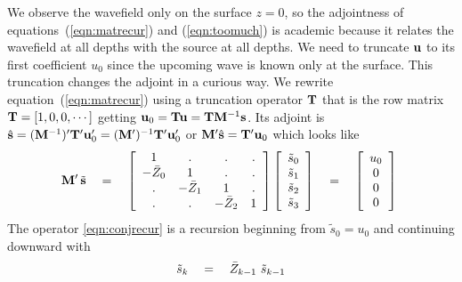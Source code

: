 \par
We observe the wavefield only on the surface $z=0$,
so the adjointness of
equations~(\ref{eqn:matrecur})
and (\ref{eqn:toomuch})
is academic because it relates the wavefield at all depths
with the source at all depths.
We need to truncate $\bold u$ to its first coefficient $u_0$
since the upcoming wave is known only at the surface.
This truncation changes the adjoint in a curious way.
We rewrite equation~(\ref{eqn:matrecur})
using a truncation operator $\bold T$ that is
the row matrix $\bold T = [1,0,0,\cdots ]$ getting
$\bold u_0 = \bold T\bold u = \bold T \bold M^{-1} \bold s$.
Its adjoint is
$\hat {\bold s} = (\bold M^{-1})' \bold T' \bold u_0'
                = (\bold M')^{-1} \bold T' \bold u_0' $
or
$\bold M' \hat {\bold s} = \bold T'\bold u_0$
which looks like
\begin{equation}
\bold M' \, \tilde {\bold s}  \eq
\left[
        \begin{array}{cccc}
                1         & .        &     .    &  .  \\
                -\bar Z_0 & 1        &     .    &  .  \\
                .         &-\bar Z_1 &     1    &  .  \\
                .         & .        &-\bar Z_2 &  1
        \end{array}
        \right]
\left[
        \begin{array}{c}
                \tilde s_0 \\
                \tilde s_1 \\
                \tilde s_2 \\
                \tilde s_3
                \end{array}
        \right]
\eq
\left[
        \begin{array}{c}
                u_0 \\
                0 \\
                0 \\
                0
                \end{array}
        \right] \ 
\label{eqn:conjrecur}
\end{equation}
The operator \ref{eqn:conjrecur} is a recursion
beginning from $\tilde s_0 = u_0$
and continuing downward with
\begin{equation}
\tilde s_k \quad =\quad \bar Z_{k-1} \  \tilde s_{k-1}
\label{eqn:imaging}
\end{equation}

